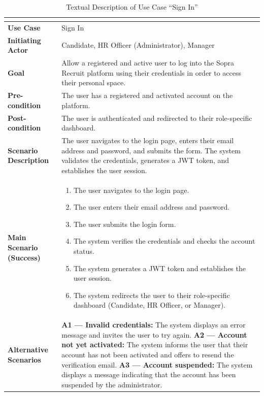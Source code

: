 \setlength{\tabcolsep}{4pt}
\renewcommand{\arraystretch}{1.6}
\begin{table}[H]
\centering
\small
\begin{tabularx}{\textwidth}{|>{\bfseries\arraybackslash}p{4cm}|X|}
\hline
\rowcolor{headerblue}
\multicolumn{2}{|c|}{\textbf{Use Case: Sign In}} \\
\hline
Use Case            & Sign In \\
\hline
Initiating Actor    & Candidate, HR Officer (Administrator), Manager \\
\hline
Goal                & Allow a registered and active user to log into the Sopra Recruit platform using their credentials in order to access their personal space. \\
\hline
Pre-condition       & The user has a registered and activated account on the platform. \\
\hline
Post-condition      & The user is authenticated and redirected to their role-specific dashboard. \\
\hline
Scenario Description &
The user navigates to the login page, enters their email address and password, and submits the form. The system validates the credentials, generates a JWT token, and establishes the user session. \\
\hline
Main Scenario (Success) &
\begin{enumerate}[leftmargin=*, label=\arabic*., topsep=0pt, itemsep=0pt]
    \item The user navigates to the login page.
    \item The user enters their email address and password.
    \item The user submits the login form.
    \item The system verifies the credentials and checks the account status.
    \item The system generates a JWT token and establishes the user session.
    \item The system redirects the user to their role-specific dashboard (Candidate, HR Officer, or Manager).
\end{enumerate} \\
\hline
Alternative Scenarios &
\textbf{A1 --- Invalid credentials:} The system displays an error message and invites the user to try again. \newline
\textbf{A2 --- Account not yet activated:} The system informs the user that their account has not been activated and offers to resend the verification email. \newline
\textbf{A3 --- Account suspended:} The system displays a message indicating that the account has been suspended by the administrator. \\
\hline
\end{tabularx}
\caption{Textual Description of Use Case ``Sign In''}
\label{tab:uc-signin}
\end{table}
\normalsize
\setlength{\tabcolsep}{6pt}
\renewcommand{\arraystretch}{1}

